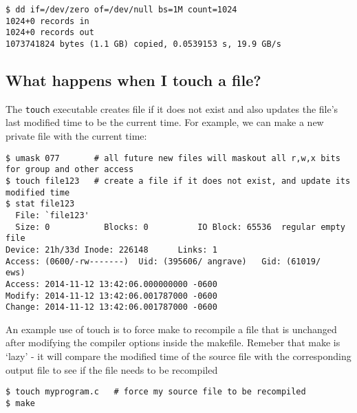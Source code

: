 \begin{verbatim}
$ dd if=/dev/zero of=/dev/null bs=1M count=1024
1024+0 records in
1024+0 records out
1073741824 bytes (1.1 GB) copied, 0.0539153 s, 19.9 GB/s
\end{verbatim}

\subsection{What happens when I touch a
file?}\label{what-happens-when-i-touch-a-file}

The \texttt{touch} executable creates file if it does not exist and also
updates the file's last modified time to be the current time. For
example, we can make a new private file with the current time:

\begin{verbatim}
$ umask 077       # all future new files will maskout all r,w,x bits for group and other access
$ touch file123   # create a file if it does not exist, and update its modified time
$ stat file123
  File: `file123'
  Size: 0           Blocks: 0          IO Block: 65536  regular empty file
Device: 21h/33d Inode: 226148      Links: 1
Access: (0600/-rw-------)  Uid: (395606/ angrave)   Gid: (61019/     ews)
Access: 2014-11-12 13:42:06.000000000 -0600
Modify: 2014-11-12 13:42:06.001787000 -0600
Change: 2014-11-12 13:42:06.001787000 -0600
\end{verbatim}

An example use of touch is to force make to recompile a file that is
unchanged after modifying the compiler options inside the makefile.
Remeber that make is `lazy' - it will compare the modified time of the
source file with the corresponding output file to see if the file needs
to be recompiled

\begin{verbatim}
$ touch myprogram.c   # force my source file to be recompiled
$ make
\end{verbatim}

